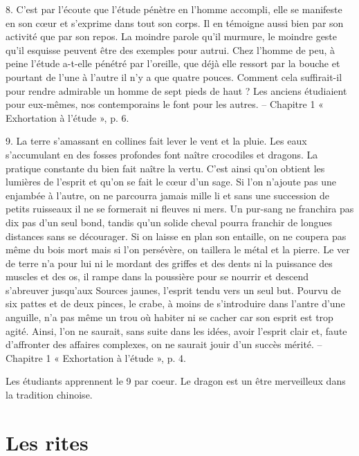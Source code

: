 \begin{singlequote}
    8.	C’est par l’écoute que l’étude pénètre en l’homme accompli, elle se manifeste en son cœur et s’exprime dans tout son corps. Il en témoigne aussi bien par son activité que par son repos. La moindre parole qu’il murmure, le moindre geste qu’il esquisse peuvent être des exemples pour autrui. Chez l’homme de peu, à peine l’étude a-t-elle pénétré par l’oreille, que déjà elle ressort par la bouche et pourtant de l’une à l’autre il n’y a que quatre pouces. Comment cela suffirait-il pour rendre admirable un homme de sept pieds de haut ? Les anciens étudiaient pour eux-mêmes, nos contemporains le font pour les autres.
-- Chapitre 1 « Exhortation à l’étude », p. 6.
\end{singlequote}



\begin{singlequote}
    9.	La terre s’amassant en collines fait lever le vent et la pluie. Les eaux s’accumulant en des fosses profondes font naître crocodiles et dragons. La pratique constante du bien fait naître la vertu. C’est ainsi qu’on obtient les lumières de l’esprit et qu’on se fait le cœur d’un sage. Si l’on n’ajoute pas une enjambée à l’autre, on ne parcourra jamais mille li et sans une succession de petits ruisseaux il ne se formerait ni fleuves ni mers. Un pur-sang ne franchira pas dix pas d’un seul bond, tandis qu’un solide cheval pourra franchir de longues distances sans se décourager. Si on laisse en plan son entaille, on ne coupera pas même du bois mort mais si l’on persévère, on taillera le métal et la pierre. Le ver de terre n’a pour lui ni le mordant des griffes et des dents ni la puissance des muscles et des os, il rampe dans la poussière pour se nourrir et descend s’abreuver jusqu’aux Sources jaunes, l’esprit tendu vers un seul but. Pourvu de six pattes et de deux pinces, le crabe, à moins de s’introduire dans l’antre d’une anguille, n’a pas même un trou où habiter ni se cacher car son esprit est trop agité. Ainsi, l’on ne saurait, sans suite dans les idées, avoir l’esprit clair et, faute d’affronter des affaires complexes, on ne saurait jouir d’un succès mérité.
-- Chapitre 1 « Exhortation à l’étude », p. 4.
\end{singlequote}
Les étudiants apprennent le 9 par coeur. 
Le dragon est un être merveilleux dans la tradition chinoise.



\section{Les rites
}

